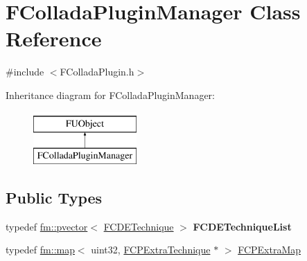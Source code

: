 \hypertarget{classFColladaPluginManager}{
\section{FColladaPluginManager Class Reference}
\label{classFColladaPluginManager}
}


{\ttfamily \#include $<$FColladaPlugin.h$>$}

Inheritance diagram for FColladaPluginManager:\begin{figure}[H]
\begin{center}
\leavevmode
\includegraphics[height=2.000000cm]{classFColladaPluginManager}
\end{center}
\end{figure}
\subsection*{Public Types}
\begin{DoxyCompactItemize}
\item 
\hypertarget{classFColladaPluginManager_ac43b0b6a12e090062517054564c609d4}{
typedef \hyperlink{classfm_1_1pvector}{fm::pvector}$<$ \hyperlink{classFCDETechnique}{FCDETechnique} $>$ {\bfseries FCDETechniqueList}}
\label{classFColladaPluginManager_ac43b0b6a12e090062517054564c609d4}

\item 
typedef \hyperlink{classfm_1_1map}{fm::map}$<$ uint32, \hyperlink{classFCPExtraTechnique}{FCPExtraTechnique} $\ast$ $>$ \hyperlink{classFColladaPluginManager_a31b0354a9ddff1b9f6eb4543662bbed8}{FCPExtraMap}
\end{DoxyCompactItemize}
